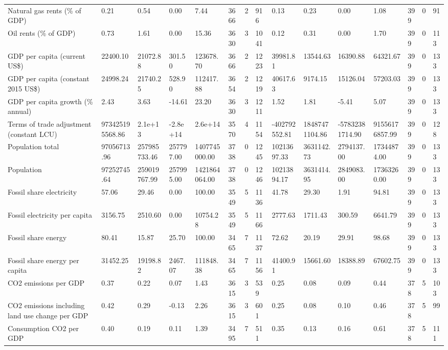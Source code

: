 \begin{longtable}{lllllllllllllll}
Natural gas rents (\% of GDP) & 0.21 & 0.54 & 0.00 & 7.44 & 3666 & 2 & 916 & 0.13 & 0.23 & 0.00 & 1.08 & 399 & 0 & 91\\
Oil rents (\% of GDP) & 0.73 & 1.61 & 0.00 & 15.36 & 3630 & 3 & 1041 & 0.12 & 0.31 & 0.00 & 1.70 & 399 & 0 & 113\\
GDP per capita (current US\$) & 22400.10 & 21072.88 & 301.50 & 123678.70 & 3666 & 2 & 1223 & 39981.81 & 13544.63 & 16390.88 & 64321.67 & 399 & 0 & 133\\
GDP per capita (constant 2015 US\$) & 24998.24 & 21740.25 & 528.90 & 112417.88 & 3654 & 2 & 1219 & 40617.63 & 9174.15 & 15126.04 & 57203.03 & 399 & 0 & 133\\
\addlinespace
GDP per capita growth (\% annual) & 2.43 & 3.63 & -14.61 & 23.20 & 3630 & 3 & 1211 & 1.52 & 1.81 & -5.41 & 5.07 & 399 & 0 & 133\\
Terms of trade adjustment (constant LCU) & 973425195568.86 & 2.1e+13 & -2.8e+14 & 2.6e+14 & 3570 & 4 & 1154 & -402792552.81 & 18487471104.86 & -57832381714.90 & 91556176857.99 & 399 & 0 & 128\\
Population total & 97056713.96 & 257985733.46 & 257797.00 & 1407745000.00 & 3738 & 0 & 1245 & 10213697.33 & 3631142.73 & 2794137.00 & 17344874.00 & 399 & 0 & 133\\
Population & 97252745.64 & 259019767.99 & 257995.00 & 1421864064.00 & 3738 & 0 & 1246 & 10213894.17 & 3631414.95 & 2849083.00 & 17363260.00 & 399 & 0 & 133\\
Fossil share electricity & 57.06 & 29.46 & 0.00 & 100.00 & 3549 & 5 & 1136 & 41.78 & 29.30 & 1.91 & 94.81 & 399 & 0 & 133\\
\addlinespace
Fossil electricity per capita & 3156.75 & 2510.60 & 0.00 & 10754.28 & 3549 & 5 & 1166 & 2777.63 & 1711.43 & 300.59 & 6641.79 & 399 & 0 & 133\\
Fossil share energy & 80.41 & 15.87 & 25.70 & 100.00 & 3465 & 7 & 1137 & 72.62 & 20.19 & 29.91 & 98.68 & 399 & 0 & 133\\
Fossil share energy per capita & 31452.25 & 19198.82 & 2467.07 & 111848.38 & 3465 & 7 & 1156 & 41400.91 & 15661.60 & 18388.89 & 67602.75 & 399 & 0 & 133\\
CO2 emissions per GDP & 0.37 & 0.22 & 0.07 & 1.43 & 3615 & 3 & 539 & 0.25 & 0.08 & 0.09 & 0.44 & 378 & 5 & 103\\
CO2 emissions including land use change per GDP & 0.42 & 0.29 & -0.13 & 2.26 & 3615 & 3 & 601 & 0.25 & 0.08 & 0.10 & 0.46 & 378 & 5 & 99\\
\addlinespace
Consumption CO2 per GDP & 0.40 & 0.19 & 0.11 & 1.39 & 3495 & 7 & 511 & 0.35 & 0.13 & 0.16 & 0.61 & 378 & 5 & 111\\

\end{longtable}
